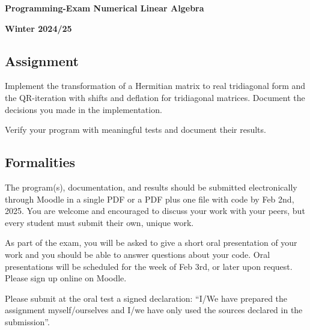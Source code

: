 \documentclass[a4paper]{article}
\begin{document}
\sffamily
\begin{center}
  \textbf{\Large Programming-Exam Numerical Linear Algebra}
  
  \textbf{Winter 2024/25}
\end{center}

\subsection*{Assignment}

Implement the transformation of a Hermitian matrix to real tridiagonal form and the QR-iteration with shifts and deflation for tridiagonal matrices. Document the decisions you made in the implementation.

Verify your program with meaningful tests and document their results.

\subsection*{Formalities}

The program(s), documentation, and results should be submitted
electronically through Moodle in a single PDF or a PDF plus one file
with code by Feb 2nd, 2025. You are welcome and encouraged to discuss
your work with your peers, but every student must submit their own,
unique work.

As part of the exam, you will be asked to give a short oral
presentation of your work and you should be able to answer questions
about your code.  Oral presentations will be scheduled for the week of
Feb 3rd, or later upon request. Please sign up online on Moodle.

Please submit at the oral test a signed declaration: ``I/We have
  prepared the assignment myself/ourselves and I/we have only used the
  sources declared in the submission''.
\end{document}
